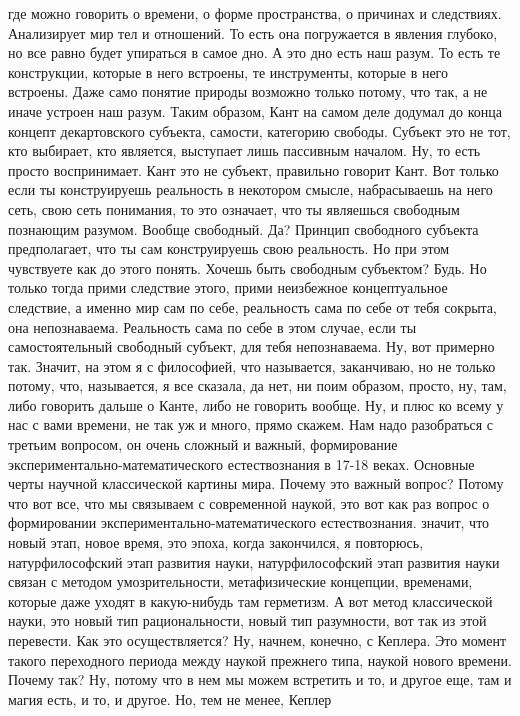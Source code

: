 где можно говорить о времени, о форме пространства, о причинах и следствиях.
Анализирует мир тел и отношений. То есть она погружается в явления глубоко, но
все равно будет упираться в самое дно. А это дно есть наш разум. То есть те
конструкции, которые в него встроены, те инструменты, которые в него встроены.
Даже само понятие природы возможно только потому, что так, а не иначе устроен
наш разум. Таким образом, Кант на самом деле додумал до конца концепт
декартовского субъекта, самости, категорию свободы. Субъект это не тот, кто
выбирает, кто является, выступает лишь пассивным началом. Ну, то есть просто
воспринимает. Кант это не субъект, правильно говорит Кант. Вот только если ты
конструируешь реальность в некотором смысле, набрасываешь на него сеть, свою
сеть понимания, то это означает, что ты являешься свободным познающим разумом.
Вообще свободный. Да? Принцип свободного субъекта предполагает, что ты сам
конструируешь свою реальность. Но при этом чувствуете как до этого понять.
Хочешь быть свободным субъектом? Будь. Но только тогда прими следствие этого,
прими неизбежное концептуальное следствие, а именно мир сам по себе, реальность
сама по себе от тебя сокрыта, она непознаваема. Реальность сама по себе в этом
случае, если ты самостоятельный свободный субъект, для тебя непознаваема. Ну,
вот примерно так. Значит, на этом я с философией, что называется, заканчиваю, но
не только потому, что, называется, я все сказала, да нет, ни поим образом,
просто, ну, там, либо говорить дальше о Канте, либо не говорить вообще. Ну, и
плюс ко всему у нас с вами времени, не так уж и много, прямо скажем. Нам надо
разобраться с третьим вопросом, он очень сложный и важный, формирование
экспериментально-математического естествознания в 17-18 веках. Основные черты
научной классической картины мира. Почему это важный вопрос? Потому что вот все,
что мы связываем с современной наукой, это вот как раз вопрос о формировании
экспериментально-математического естествознания. значит, что новый этап, новое
время, это эпоха, когда закончился, я повторюсь, натурфилософский этап развития
науки, натурфилософский этап развития науки связан с методом умозрительности,
метафизические концепции, временами, которые даже уходят в какую-нибудь там
герметизм. А вот метод классической науки, это новый тип рациональности, новый
тип разумности, вот так из этой перевести. Как это осуществляется? Ну, начнем,
конечно, с Кеплера. Это момент такого переходного периода между наукой прежнего
типа, наукой нового времени. Почему так? Ну, потому что в нем мы можем встретить
и то, и другое еще, там и магия есть, и то, и другое. Но, тем не менее, Кеплер
